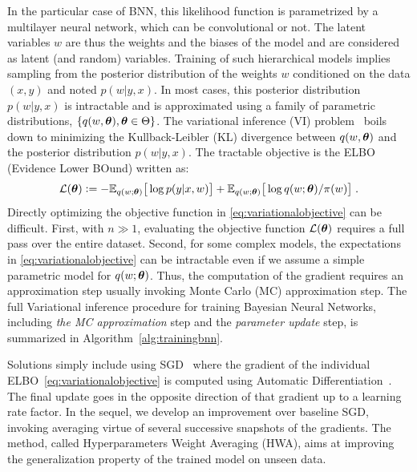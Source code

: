 \documentclass[tablecaption=bottom,wcp]{jmlr} %
\begin{document}
In the particular case of BNN, this likelihood function is parametrized by a multilayer neural network, which can be convolutional or not.
The latent variables $w$ are thus the weights and the biases of the model and are considered as latent (and random) variables.
Training of such hierarchical models implies sampling from the posterior distribution of the weights $w$ conditioned on the data $(x,y)$ and noted $p(w|y,x)$.
In most cases, this posterior distribution $p(w|y,x)$ is intractable and is approximated using a family of parametric distributions, $\{q(w, \param ), \param \in \Param \}$. 
The variational inference (VI) problem~\citep{blei2017variational} boils down to minimizing the Kullback-Leibler (KL) divergence between $q(w, \param )$ and the posterior distribution $p(w|y,x)$. The tractable objective is the ELBO (Evidence Lower BOund) written as:
\begin{equation}\label{eq:variationalobjective}
{\cal L}(\param) \eqdef -\EE_{ q( w; \param )} \big[\log p(y | x, w) \big]+  \EE_{ q( w; \param )} \big[ \log q(w; \param )/\prior(w) \big]  \eqsp.
\end{equation}
Directly optimizing the objective function in \eqref{eq:variationalobjective} can be difficult.
First, with $n \gg 1$, evaluating the objective function ${\cal L}( \param )$ requires a full pass over the entire dataset.
Second, for some complex models, the expectations in \eqref{eq:variationalobjective} can be intractable even if we assume a simple parametric model for $q(w; \param)$.
Thus, the computation of the gradient requires an approximation step usually invoking Monte Carlo (MC) approximation step. 
The full Variational inference procedure for training Bayesian Neural Networks, including \textit{the MC approximation} step and the \textit{parameter update} step, is summarized in Algorithm~\ref{alg:trainingbnn}.

Solutions simply include using SGD~\citep{bottou2008tradeoffs} where the gradient of the individual ELBO~\eqref{eq:variationalobjective} is computed using Automatic Differentiation~\citep{kucukelbir2017automatic}. 
The final update goes in the opposite direction of that gradient up to a learning rate factor.
In the sequel, we develop an improvement over baseline SGD, invoking averaging virtue of several successive snapshots of the gradients.
The method, called Hyperparameters Weight Averaging (HWA), aims at improving the generalization property of the trained model on unseen data.
\end{document}
